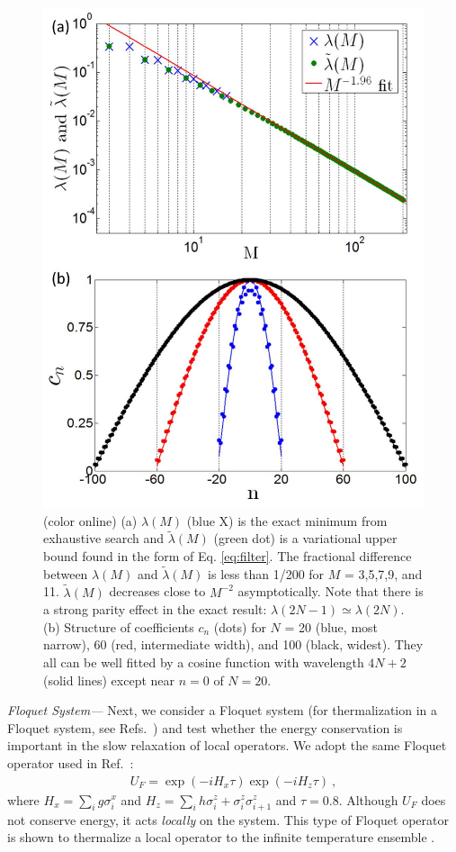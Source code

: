 \documentclass[twocolumn,superscriptaddress, prl,showpacs]{revtex4-1}
\begin{document}
\begin{figure}
\includegraphics[width=0.95\linewidth]{fig_floquet.pdf}
\centering
\caption{(color online) (a) $\lambda(M)$ (blue X) is the exact minimum from exhaustive search and $\tilde{\lambda}(M)$ (green dot) is a variational upper bound found in the form of Eq. \eqref{eq:filter}. The fractional difference between $\lambda(M)$ and $\tilde{\lambda}(M)$ is less than 1/200 for $M$ = 3,5,7,9, and 11. $\tilde{\lambda}(M)$ decreases close to $M^{-2}$ asymptotically. Note that there is a strong parity effect in the exact result: $\lambda(2N-1) \simeq \lambda(2N)$.
(b) Structure of coefficients $c_n$ (dots) for $N$ = 20 (blue, most narrow), 60 (red, intermediate width), and 100 (black, widest). They all can be well fitted by a cosine function with wavelength $4N+2$ (solid lines) except near $n = 0$ of $N = 20$. }
\label{fig:floquet}
\end{figure}


{\it Floquet System---}
Next, we consider a Floquet system (for thermalization in a Floquet system, see Refs.~) and test whether the energy conservation is important in the slow relaxation of local operators.
We adopt the same Floquet operator used in Ref.~:
\begin{align}
U_F = \exp(-i H_x \tau) \exp(-i H_z \tau) ~,
\label{eq:floquet_op}
\end{align}
where $H_x = \sum_i g \sigma^x_i$ and $H_z = \sum_i h \sigma^z_i +\sigma^z_i \sigma^z_{i+1}$
and $\tau = 0.8$.
Although $U_F$ does not conserve energy, it acts {\it locally} on the system.
This type of Floquet operator is shown to thermalize a local operator to the infinite temperature ensemble \cite{Kim_ETH,Prosen:2002}.
\end{document}
